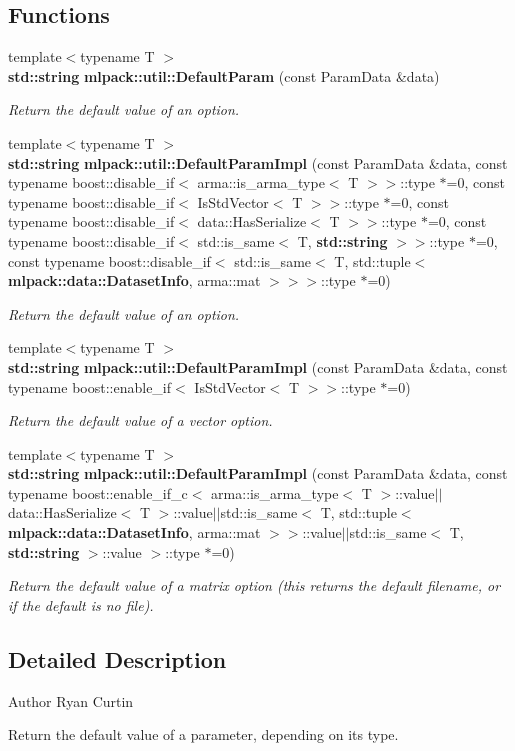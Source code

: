 \subsection*{Functions}
\begin{DoxyCompactItemize}
\item 
{\footnotesize template$<$typename T $>$ }\\{\bf std\+::string} {\bf mlpack\+::util\+::\+Default\+Param} (const Param\+Data \&data)
\begin{DoxyCompactList}\small\item\em Return the default value of an option. \end{DoxyCompactList}\item 
{\footnotesize template$<$typename T $>$ }\\{\bf std\+::string} {\bf mlpack\+::util\+::\+Default\+Param\+Impl} (const Param\+Data \&data, const typename boost\+::disable\+\_\+if$<$ arma\+::is\+\_\+arma\+\_\+type$<$ T $>$$>$\+::type $\ast$=0, const typename boost\+::disable\+\_\+if$<$ Is\+Std\+Vector$<$ T $>$$>$\+::type $\ast$=0, const typename boost\+::disable\+\_\+if$<$ data\+::\+Has\+Serialize$<$ T $>$$>$\+::type $\ast$=0, const typename boost\+::disable\+\_\+if$<$ std\+::is\+\_\+same$<$ T, {\bf std\+::string} $>$$>$\+::type $\ast$=0, const typename boost\+::disable\+\_\+if$<$ std\+::is\+\_\+same$<$ T, std\+::tuple$<$ {\bf mlpack\+::data\+::\+Dataset\+Info}, arma\+::mat $>$$>$$>$\+::type $\ast$=0)
\begin{DoxyCompactList}\small\item\em Return the default value of an option. \end{DoxyCompactList}\item 
{\footnotesize template$<$typename T $>$ }\\{\bf std\+::string} {\bf mlpack\+::util\+::\+Default\+Param\+Impl} (const Param\+Data \&data, const typename boost\+::enable\+\_\+if$<$ Is\+Std\+Vector$<$ T $>$$>$\+::type $\ast$=0)
\begin{DoxyCompactList}\small\item\em Return the default value of a vector option. \end{DoxyCompactList}\item 
{\footnotesize template$<$typename T $>$ }\\{\bf std\+::string} {\bf mlpack\+::util\+::\+Default\+Param\+Impl} (const Param\+Data \&data, const typename boost\+::enable\+\_\+if\+\_\+c$<$ arma\+::is\+\_\+arma\+\_\+type$<$ T $>$\+::value$\vert$$\vert$data\+::\+Has\+Serialize$<$ T $>$\+::value$\vert$$\vert$std\+::is\+\_\+same$<$ T, std\+::tuple$<$ {\bf mlpack\+::data\+::\+Dataset\+Info}, arma\+::mat $>$$>$\+::value$\vert$$\vert$std\+::is\+\_\+same$<$ T, {\bf std\+::string} $>$\+::value $>$\+::type $\ast$=0)
\begin{DoxyCompactList}\small\item\em Return the default value of a matrix option (this returns the default filename, or \textquotesingle{}\textquotesingle{} if the default is no file). \end{DoxyCompactList}\end{DoxyCompactItemize}


\subsection{Detailed Description}
\begin{DoxyAuthor}{Author}
Ryan Curtin
\end{DoxyAuthor}
Return the default value of a parameter, depending on its type. 